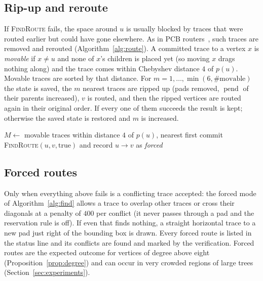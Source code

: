 \documentclass[11pt,a4paper]{article}
\theoremstyle{remark}
\newcommand{\pos}{p}
\newcommand{\pend}{\operatorname{pend}}
\begin{document}
\subsection{Rip-up and reroute}\label{sec:ripup}

If \textsc{FindRoute} fails, the space around $u$ is usually blocked by traces that were routed earlier but could
have gone elsewhere. As in PCB routers~\cite{nair1987}, such traces are removed and rerouted
(Algorithm~\ref{alg:route}). A committed trace to a vertex $x$ is \emph{movable} if $x\ne u$ and none of $x$'s
children is placed yet (so moving $x$ drags nothing along) and the trace comes within Chebyshev distance $4$ of
$\pos(u)$. Movable traces are sorted by that distance. For $m=1,\dots,\min(6,\#\text{movable})$ the state is saved, the
$m$ nearest traces are ripped up (pads removed, $\pend$ of their parents increased), $v$ is routed, and then the
ripped vertices are routed again in their original order. If every one of them succeeds the result is kept;
otherwise the saved state is restored and $m$ is increased.

\begin{algorithm}[t]
\caption{\textsc{Route}$(u,v)$ with rip-up and reroute}\label{alg:route}
\DontPrintSemicolon
{}
$M\gets$ movable traces within distance $4$ of $\pos(u)$, nearest first\;
commit \textsc{FindRoute}$(u,v,\text{true})$ and record $u\to v$ as \emph{forced}\;
\end{algorithm}

\subsection{Forced routes}\label{sec:forced}

Only when everything above fails is a conflicting trace accepted: the forced mode of Algorithm~\ref{alg:find}
allows a trace to overlap other traces or cross their diagonals at a penalty of $400$ per conflict (it never passes
through a pad and the reservation rule is off). If even that finds nothing, a straight horizontal trace to a new pad
just right of the bounding box is drawn. Every forced route is listed in the status line and its conflicts are found
and marked by the verification. Forced routes are the expected outcome for vertices of degree above eight
(Proposition~\ref{prop:degree}) and can occur in very crowded regions of large trees
(Section~\ref{sec:experiments}).
\end{document}

